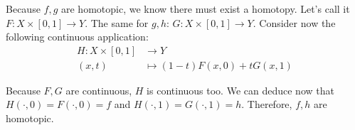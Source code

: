 \documentclass{article}
\begin{document}
    Because $f, g$ are homotopic, we know there must exist a homotopy.
    Let's call it $F \colon X \times [0, 1] \to Y$.
    The same for $g, h$:
    $G \colon X \times [0, 1] \to Y$.
    Consider now the following continuous application:
    \begin{align*}
        H \colon X \times [0, 1] &\longrightarrow Y \\
        (x, t) &\mapsto (1 - t) F(x, 0) + t G(x, 1)
    \end{align*}

    Because $F, G$ are continuous, $H$ is continuous too.
    We can deduce now that $H(\cdot, 0) = F(\cdot, 0) = f$ and $H(\cdot, 1) = G(\cdot, 1) = h$.
    Therefore, $f, h$ are homotopic.
\end{document}
